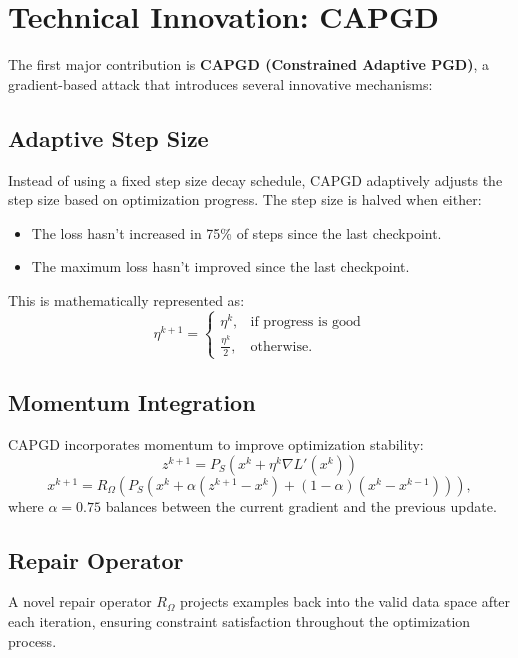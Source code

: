 \documentclass{article}
\begin{document}
\section*{Technical Innovation: CAPGD}

The first major contribution is \textbf{CAPGD (Constrained Adaptive PGD)}, a gradient-based attack that introduces several innovative mechanisms:

\subsection*{Adaptive Step Size}

Instead of using a fixed step size decay schedule, CAPGD adaptively adjusts the step size based on optimization progress. The step size is halved when either:
\begin{itemize}
    \item The loss hasn't increased in 75\% of steps since the last checkpoint.
    \item The maximum loss hasn't improved since the last checkpoint.
\end{itemize}

This is mathematically represented as:
\[
\eta^{k+1} =
\begin{cases}
\eta^{k}, & \text{if progress is good} \\
\frac{\eta^{k}}{2}, & \text{otherwise.}
\end{cases}
\]

\subsection*{Momentum Integration}

CAPGD incorporates momentum to improve optimization stability:
\[
z^{k+1} = P_S\left( x^{k} + \eta^{k} \nabla L'(x^{k}) \right)
\]
\[
x^{k+1} = R_{\Omega}\left( P_S\left( x^{k} + \alpha \left( z^{k+1} - x^{k} \right) + (1-\alpha) \left( x^{k} - x^{k-1} \right) \right) \right),
\]
where $\alpha = 0.75$ balances between the current gradient and the previous update.

\subsection*{Repair Operator}

A novel repair operator $R_{\Omega}$ projects examples back into the valid data space after each iteration, ensuring constraint satisfaction throughout the optimization process.
\end{document}
